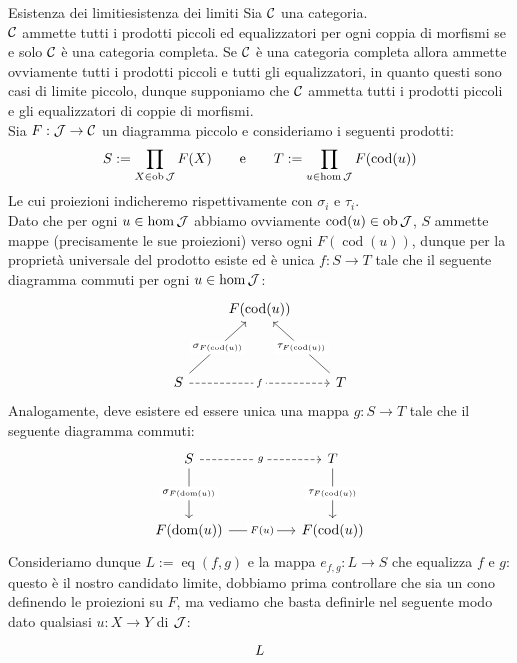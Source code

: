\documentclass{article}
\renewcommand\C{\mc{C}}
\newcommand\J{\mc{J}}
\newcommand\eq{\operatorname{eq}}
\newcommand\cod{\operatorname{cod}}
\begin{document}
\begin{theorem}{Esistenza dei limiti}{esistenza dei limiti}
    Sia $\C$ una categoria.\\
    $\C$ ammette tutti i prodotti piccoli ed equalizzatori per ogni coppia di morfismi se e solo $\C$ è una categoria completa.
    \proof 
    Se $\C$ è una categoria completa allora ammette ovviamente tutti i prodotti piccoli e tutti gli equalizzatori, in quanto questi sono casi di limite piccolo, dunque supponiamo che $\C$ ammetta tutti i prodotti piccoli e gli equalizzatori di coppie di morfismi.\\
    Sia $F:\J\to\C$ un diagramma piccolo e consideriamo i seguenti prodotti: 
    \[ S := \prod_{X \in\ob\J}F(X) \qquad\text{e}\qquad T:= \prod_{u \in \hom\J} F(\cod(u)) \]
    Le cui proiezioni indicheremo rispettivamente con $\sigma_i$ e $\tau_i$.\\
    Dato che per ogni $u \in \hom\J$ abbiamo ovviamente $\cod(u) \in \ob\J$, $S$ ammette mappe (precisamente le sue proiezioni) verso ogni $F(\cod(u))$, dunque per la proprietà universale del prodotto esiste ed è unica $f:S\to T$ tale che il seguente diagramma commuti per ogni $u \in \hom\J$:
    \[\begin{tikzcd}
    	& {F(\cod(u))} \\
	    \\
    	S && T
    	\arrow["{\sigma_{F(\cod(u))}}"{description}, from=3-1, to=1-2]
    	\arrow["f"{description}, dashed, from=3-1, to=3-3]
    	\arrow["{\tau_{F(\cod(u))}}"{description}, from=3-3, to=1-2]
    \end{tikzcd}\]
    Analogamente, deve esistere ed essere unica una mappa $g: S\to T$ tale che il seguente diagramma commuti:
        \[\begin{tikzcd}
    	S && T \\
    	\\
    	{F(\dom(u))} && {F(\cod(u))}
    	\arrow["g"{description}, dashed, from=1-1, to=1-3]
    	\arrow["{\sigma_{F(\dom(u))}}"{description}, from=1-1, to=3-1]
    	\arrow["{\tau_{F(\cod(u))}}"{description}, from=1-3, to=3-3]
    	\arrow["{F(u)}"{description}, from=3-1, to=3-3]
    \end{tikzcd}\]
    Consideriamo dunque $L:=\eq(f,g)$ e la mappa $e_{f,g}: L \to S$ che equalizza $f$ e $g$: questo è il nostro candidato limite, dobbiamo prima controllare che sia un cono definendo le proiezioni su $F$, ma vediamo che basta definirle nel seguente modo dato qualsiasi $u:X\to Y$ di $\J$:
    \[\begin{tikzcd}
    	{L} \\

\end{tikzcd}\]
\end{theorem}
\end{document}
